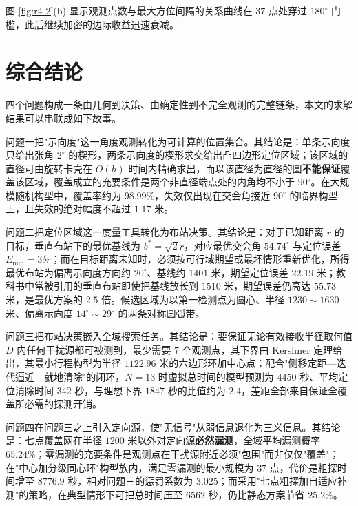 \documentclass[12pt,a4paper]{ctexart}
\begin{document}
图 \ref{fig:r4-2}(b) 显示观测点数与最大方位间隔的关系曲线在 $37$ 点处穿过 $180^\circ$ 门槛，此后继续加密的边际收益迅速衰减。

\section{综合结论}

四个问题构成一条由几何到决策、由确定性到不完全观测的完整链条，本文的求解结果可以串联成如下故事。

问题一把"示向度"这一角度观测转化为可计算的位置集合。其结论是：单条示向度只给出张角 $2^\circ$ 的楔形，两条示向度的楔形求交给出凸四边形定位区域；该区域的直径可由旋转卡壳在 $O(h)$ 时间内精确求出，而以该直径为直径的圆\textbf{不能保证}覆盖该区域，覆盖成立的充要条件是两个非直径端点处的内角均不小于 $90^\circ$。在大规模随机构型中，覆盖率约为 $98.99\%$，失效仅出现在交会角接近 $90^\circ$ 的临界构型上，且失效的绝对幅度不超过 $1.17$ 米。

问题二把定位区域这一度量工具转化为布站决策。其结论是：对于已知距离 $r$ 的目标，垂直布站下的最优基线为 $b^*=\sqrt2r$，对应最优交会角 $54.74^\circ$ 与定位误差 $E_{\min}=3\delta r$；而在目标距离未知时，必须按可行域期望或最坏情形重新优化，所得最优布站为偏离示向度方向约 $20^\circ$、基线约 $1401$ 米，期望定位误差 $22.19$ 米；教科书中常被引用的垂直布站即使把基线放长到 $1510$ 米，期望误差仍高达 $55.73$ 米，是最优方案的 $2.5$ 倍。候选区域为以第一检测点为圆心、半径 $1230\sim1630$ 米、偏离示向度 $14^\circ\sim29^\circ$ 的两条对称圆弧带。

问题三把布站决策嵌入全域搜索任务。其结论是：要保证无论有效接收半径取何值 $D$ 内任何干扰源都可被测到，最少需要 $7$ 个观测点，其下界由 Kershner 定理给出，其最小行程构型为半径 $1122.96$ 米的六边形环加中心点；配合"侧移定距—迭代逼近—就地清除"的闭环，$N=13$ 时虚拟总时间的模型预测为 $4450$ 秒、平均定位清除时间 $342$ 秒，与理想下界 $1847$ 秒的比值约为 $2.4$，差距全部来自保证全覆盖所必需的探测开销。

问题四在问题三之上引入定向源，使"无信号"从弱信息退化为三义信息。其结论是：七点覆盖网在半径 $1200$ 米以外对定向源\textbf{必然漏测}，全域平均漏测概率 $65.24\%$；零漏测的充要条件是观测点在干扰源附近必须"包围"而非仅仅"覆盖"；在"中心加分级同心环"构型族内，满足零漏测的最小规模为 $37$ 点，代价是粗探时间增至 $8776.9$ 秒，相对问题三的惩罚系数为 $3.025$；而采用"七点粗探加自适应补测"的策略，在典型情形下可把总时间压至 $6562$ 秒，仍比静态方案节省 $25.2\%$。
\end{document}
